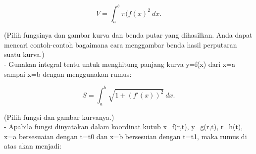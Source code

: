 \documentclass[a4paper,10pt]{article}
\begin{document}
\begin{eulernotebook}
\begin{eulercomment}
\begin{eulercomment}
\begin{eulercomment}
\begin{eulercomment}
\begin{eulercomment}
\end{eulercomment}
\begin{eulerformula}
\[
V = \int_a^b \pi (f(x)^2\ dx.
\]
\end{eulerformula}
\begin{eulercomment}
(Pilih fungsinya dan gambar kurva dan benda putar yang dihasilkan.
Anda dapat mencari contoh-contoh bagaimana cara menggambar benda hasil
perputaran suatu kurva.)\\
- Gunakan integral tentu untuk menghitung panjang kurva y=f(x) dari
x=a sampai x=b dengan menggunakan rumus:

\end{eulercomment}
\begin{eulerformula}
\[
S = \int_a^b \sqrt{1+(f'(x))^2} \ dx.
\]
\end{eulerformula}
\begin{eulercomment}
(Pilih fungsi dan gambar kurvanya.)\\
- Apabila fungsi dinyatakan dalam koordinat kutub x=f(r,t), y=g(r,t),
r=h(t), x=a bersesuaian dengan t=t0 dan x=b bersesuian dengan t=t1,
maka rumus di atas akan menjadi:


\end{eulercomment}
\end{eulercomment}
\end{eulercomment}
\end{eulercomment}
\end{eulercomment}
\end{eulernotebook}
\end{document}
